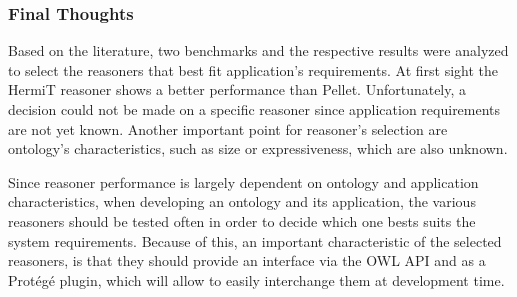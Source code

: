 \subsubsection{Final Thoughts}

Based on the literature, two benchmarks and the respective results were analyzed to select the reasoners that best fit application's requirements. At first sight the HermiT reasoner shows a better performance than Pellet.  Unfortunately, a decision could not be made on a specific reasoner since application requirements are not yet known. Another important point for reasoner's selection are ontology's characteristics, such as size or expressiveness, which are also unknown. 

Since reasoner performance is largely dependent on ontology and application characteristics, when developing an ontology and its application, the various reasoners should be tested often in order to decide which one bests suits the system requirements. Because of this, an important characteristic of the selected reasoners, is that they should provide an interface via the OWL API and as a Protégé plugin, which will allow to easily interchange them at development time. 
